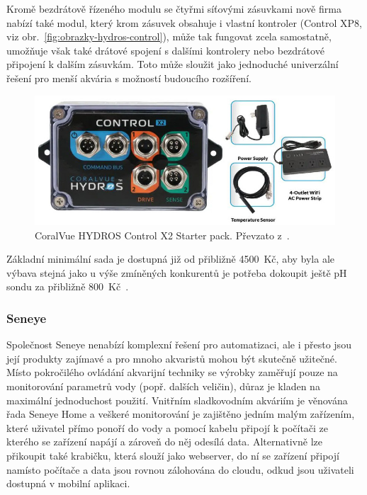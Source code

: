             Kromě bezdrátově řízeného modulu se čtyřmi síťovými zásuvkami nově firma nabízí také modul, který krom zásuvek obsahuje i vlastní kontroler (Control XP8, viz obr.~\ref{fig:obrazky-hydros-control}), může tak fungovat zcela samostatně, umožňuje však také drátové spojení s dalšími kontrolery nebo bezdrátové připojení k dalším zásuvkám. Toto může sloužit jako jednoduché univerzální řešení pro menší akvária s možností budoucího rozšíření. 

            \begin{figure}[h!]
                \centering
                \includegraphics[width=\textwidth]{obrazky/trh/hydros-x2-starter-pack.jpg}
                \caption{CoralVue HYDROS Control X2 Starter pack. Převzato z~\cite{eshop-coralvue-hydros}.}
                \label{fig:obrazky-trh-hydros-x2-starter-pack-jpg}
            \end{figure}
            
            Základní minimální sada je dostupná již od přibližně \qty{4500}{Kč}, aby byla ale výbava stejná jako u výše zmíněných konkurentů je potřeba dokoupit ještě pH sondu za přibližně \qty{800}{Kč}~\cite{coralvuehydros,eshop-coralvue-hydros}.
            
        \subsubsection{Seneye}
            Společnost Seneye nenabízí komplexní řešení pro automatizaci, ale i přesto jsou její produkty zajímavé a pro mnoho akvaristů mohou být skutečně užitečné. Místo pokročilého ovládání akvarijní techniky se výrobky zaměřují pouze na monitorování parametrů vody (popř. dalších veličin), důraz je kladen na maximální jednoduchost použití. Vnitřním sladkovodním akváriím je věnována řada Seneye Home a veškeré monitorování je zajištěno jedním malým zařízením, které uživatel přímo ponoří do vody a pomocí kabelu připojí k počítači ze kterého se zařízení napájí a zároveň do něj odesílá data. Alternativně lze přikoupit také krabičku, která slouží jako webserver, do ní se zařízení připojí namísto počítače a data jsou rovnou zálohována do cloudu, odkud jsou uživateli dostupná v mobilní aplikaci.

